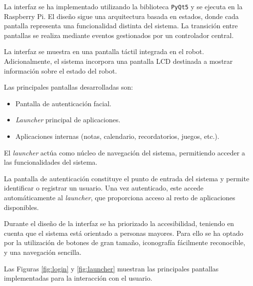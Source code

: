 \vspace{0.2cm}

La interfaz se ha implementado utilizando la biblioteca \verb|PyQt5| y se ejecuta en la Raspberry Pi. El diseño sigue una arquitectura basada en estados, donde cada pantalla representa una funcionalidad distinta del sistema. La transición entre pantallas se realiza mediante eventos gestionados por un controlador central.

\vspace{0.2cm}

La interfaz se muestra en una pantalla táctil integrada en el robot. Adicionalmente, el sistema incorpora una pantalla LCD destinada a mostrar información sobre el estado del robot.

\vspace{0.2cm}

Las principales pantallas desarrolladas son:

\begin{itemize}
    \item Pantalla de autenticación facial.
    \item \textit{Launcher} principal de aplicaciones.
    \item Aplicaciones internas (notas, calendario, recordatorios, juegos, etc.).
\end{itemize}


El \textit{launcher} actúa como núcleo de navegación del sistema, permitiendo acceder a las funcionalidades del sistema.

\vspace{0.2cm}

La pantalla de autenticación constituye el punto de entrada del sistema y permite identificar o registrar un usuario. Una vez autenticado, este accede automáticamente al \textit{launcher}, que proporciona acceso al resto de aplicaciones disponibles.

\vspace{0.2cm}

Durante el diseño de la interfaz se ha priorizado la accesibilidad, teniendo en cuenta que el sistema está orientado a personas mayores. Para ello se ha optado por la utilización de botones de gran tamaño, iconografía fácilmente reconocible, y una navegación sencilla.

Las Figuras \ref{fig:login} y \ref{fig:launcher} muestran las principales pantallas implementadas para la interacción con el usuario.


\vspace{0.2cm}

